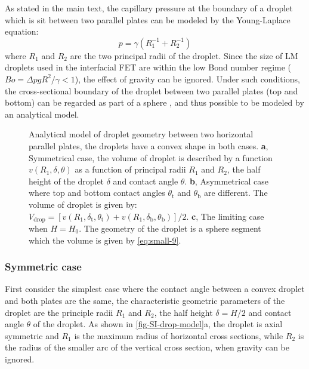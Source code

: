 As stated in the main text, the capillary pressure at the boundary of a droplet which is sit
between two parallel plates can be modeled by the Young-Laplace
equation:
\begin{equation}
\label{eq:small-3}
p = \gamma (R_{1}^{-1} + R_{2}^{-1})
\end{equation}
where \(R_{1}\) and \(R_{2}\) are the two principal radii of the
droplet. Since the size of LM droplets used in the interfacial FET are
within the low Bond number regime (\(Bo = \Delta p g R^{2} / \gamma <
1\)), the effect of gravity can be ignored. Under such conditions,
the cross-sectional boundary of the droplet between two parallel
plates (top and bottom) can be regarded as part of a sphere
\autocite{berthier_2012_microdroplet}, and thus possible to be modeled by an
analytical model.

\begin{figure}[htbp]
\centering
{}
\caption{\label{fig-SI-drop-model}%
  Analytical model of droplet geometry between two horizontal parallel
  plates, the droplets have a convex shape in both cases. \textbf{a},
  Symmetrical case, the volume of droplet is described by a function
  \(v(R_{1}, \delta, \theta)\) as a function of principal radii
  \(R_{1}\) and \(R_{2}\), the half height of the droplet \(\delta\)
  and contact angle \(\theta\). \textbf{b}, Asymmetrical case where
  top and bottom contact angles \(\theta_{\mathrm{t}}\) and
  \(\theta_{\mathrm{b}}\) are different. The volume of droplet is
  given by:
  \(V_{\mathrm{drop}} = [v(R_{1}, \delta_{\mathrm{t}},
  \theta_{\mathrm{t}}) + v(R_{1}, \delta_{\mathrm{b}},
  \theta_{\mathrm{b}})]/2\). \textbf{c}, The limiting case when
  \(H=H_{0}\). The geometry of the droplet is a sphere segment which
  the volume is given by \autoref{eq:small-9}.  }
\end{figure}

\subsubsection*{Symmetric case}
\label{sec:small-org5934fd4}

First consider the simplest case where the contact angle
between a convex droplet and both plates are the same, the
characteristic geometric parameters of the droplet are the principle
radii \(R_{1}\) and \(R_{2}\), the half height \(\delta=H/2\) and contact
angle \(\theta\) of the droplet. As
shown in \autoref{fig-SI-drop-model}a, the droplet is axial
symmetric and \(R_{1}\) is the maximum radius of horizontal cross
sections, while \(R_{2}\) is the radius of the smaller arc of the
vertical cross section, when gravity can be ignored.

